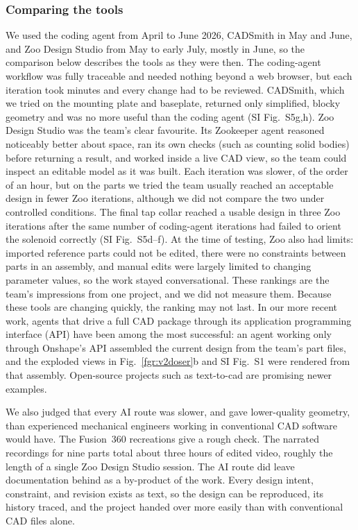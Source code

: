 \documentclass[twoside,twocolumn,9pt]{article}
\begin{document}
\subsubsection{Comparing the tools}
We used the coding agent from April to June 2026, CADSmith in May and June, and Zoo Design Studio from May to early July, mostly in June, so the comparison below describes the tools as they were then. The coding-agent workflow was fully traceable and needed nothing beyond a web browser, but each iteration took minutes and every change had to be reviewed. CADSmith, which we tried on the mounting plate and baseplate, returned only simplified, blocky geometry and was no more useful than the coding agent (SI Fig.~S5g,h). Zoo Design Studio was the team's clear favourite. Its Zookeeper agent reasoned noticeably better about space, ran its own checks (such as counting solid bodies) before returning a result, and worked inside a live CAD view, so the team could inspect an editable model as it was built. Each iteration was slower, of the order of an hour, but on the parts we tried the team usually reached an acceptable design in fewer Zoo iterations, although we did not compare the two under controlled conditions. The final tap collar reached a usable design in three Zoo iterations after the same number of coding-agent iterations had failed to orient the solenoid correctly (SI Fig.~S5d--f). At the time of testing, Zoo also had limits: imported reference parts could not be edited, there were no constraints between parts in an assembly, and manual edits were largely limited to changing parameter values, so the work stayed conversational. These rankings are the team's impressions from one project, and we did not measure them. Because these tools are changing quickly, the ranking may not last. In our more recent work, agents that drive a full CAD package through its application programming interface (API) have been among the most successful: an agent working only through Onshape's API assembled the current design from the team's part files, and the exploded views in Fig.~\ref{fgr:v2doser}b and SI Fig.~S1 were rendered from that assembly. Open-source projects such as text-to-cad\cite{TextToCad} are promising newer examples.

We also judged that every AI route was slower, and gave lower-quality geometry, than experienced mechanical engineers working in conventional CAD software would have. The Fusion~360 recreations give a rough check. The narrated recordings for nine parts total about three hours of edited video,\cite{FusionPlaylist} roughly the length of a single Zoo Design Studio session. The AI route did leave documentation behind as a by-product of the work. Every design intent, constraint, and revision exists as text, so the design can be reproduced, its history traced, and the project handed over more easily than with conventional CAD files alone.
\end{document}
